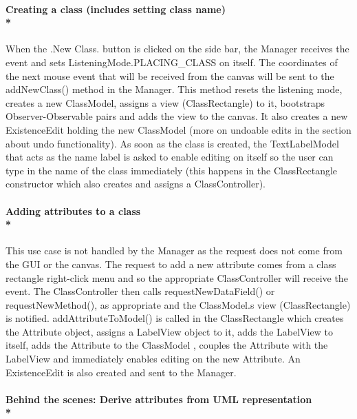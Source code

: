 \paragraph{\small{\tab Creating a class (includes setting class name)\\* }}

\hspace{-10pt} When the .New Class. button is clicked on the side bar, the Manager receives the event and sets ListeningMode.PLACING\_CLASS on itself. The coordinates of the next mouse event that will be received from the canvas will be sent to the addNewClass() method in the Manager. This method resets the listening mode, creates a new ClassModel, assigns a view (ClassRectangle) to it, bootstraps Observer-Observable pairs and adds the view to the canvas. It also creates a new ExistenceEdit holding the new ClassModel (more on undoable edits in the section about undo functionality). As soon as the class is created, the TextLabelModel that acts as the name label is asked to enable editing on itself so the user can type in the name of the class immediately (this happens in the ClassRectangle constructor which also creates and assigns a ClassController).

\paragraph{\small{\tab Adding attributes to a class\\*}}

\hspace{-10pt} This use case is not handled by the Manager as the request does not come from the GUI or the canvas. The request to add a new attribute comes from a class rectangle right-click menu and so the appropriate ClassController will receive the event. The ClassController then calls requestNewDataField() or requestNewMethod(), as appropriate and the ClassModel.s view (ClassRectangle) is notified. addAttributeToModel() is called in the ClassRectangle which creates the Attribute object, assigns a LabelView object to it, adds the LabelView to itself, adds the Attribute to the ClassModel , couples the Attribute with the LabelView and immediately enables editing on the new Attribute. An ExistenceEdit is also created and sent to the Manager.

\paragraph{\small{\tab Behind the scenes: Derive attributes from UML representation\\*}}

